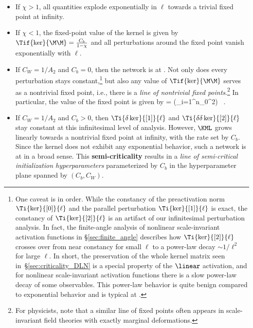 \begin{itemize}
\item If $\chi>1$,  all quantities explode exponentially in $\ell$ towards a trivial fixed point at infinity.

\item If $\chi <1$, the fixed-point value of the kernel is given by $\Tif{\ker}{\M\M}=\frac{C_b}{1-\chi}$ and all perturbations around the fixed point vanish exponentially with $\ell$.
\item If $C_W =1/A_2$ and $C_b=0$, then the network is at . %
Not only does every perturbation stays constant,\footnote{\label{foot:kink2}
One caveat is in order. While the constancy of the preactivation norm $\Ti{\ker}{[0]}{\ell}$ and the parallel perturbation $\Ti{\ker}{[1]}{\ell}$ is exact, the constancy of $\Ti{\ker}{[2]}{\ell}$ is an artifact of our infinitesimal perturbation analysis. In fact, the finite-angle analysis of nonlinear scale-invariant activation functions in \S\ref{sec:finite_angle} describes how $\Ti{\ker}{[2]}{\ell}$ crosses over from near constancy for small $\ell$ to a power-law decay $\sim1/\ell^2$ for large $\ell$. In short, the preservation of the whole kernel matrix seen in~\S\ref{sec:criticality_DLN} is a special property of the $\linear$ activation, and for nonlinear scale-invariant activation functions there is a slow power-law decay of some observables. This power-law behavior is quite benign compared to exponential behavior and is typical at .
} but also any value of $\Tif{\ker}{\M\M}$ serves as a nontrivial fixed point, i.e., there is a \emph{line of nontrivial fixed points}.\footnote{For physicists, note that a similar line of fixed points often appears in scale-invariant field theories with exactly marginal deformations.} In particular, the value of the fixed point is given by
\be\label{eq:chapter-5-scale-invariant-kernel-fixed}
\Tif{\ker}{\M\M}= \le(\sum_{i=1}^{n_0}^2\ri) \, .
\ee
\item If $C_W =1/A_2$ and $C_b>0$, then $\Ti{\delta \ker}{[1]}{\ell}$ and $\Ti{\delta\delta \ker}{[2]}{\ell}$ stay constant at this infinitesimal level of analysis.
However, $\KML$ grows linearly towards a nontrivial fixed point at infinity, with the rate set by $C_b$. 
Since the kernel does not exhibit any exponential behavior, such a network is at  in a broad sense.
This \textbf{semi-criticality} results in a \emph{line of semi-critical initialization hyperparameters} parameterized by $C_b$ in the hyperparameter plane spanned by $(C_b, C_W)$. 
\end{itemize}
